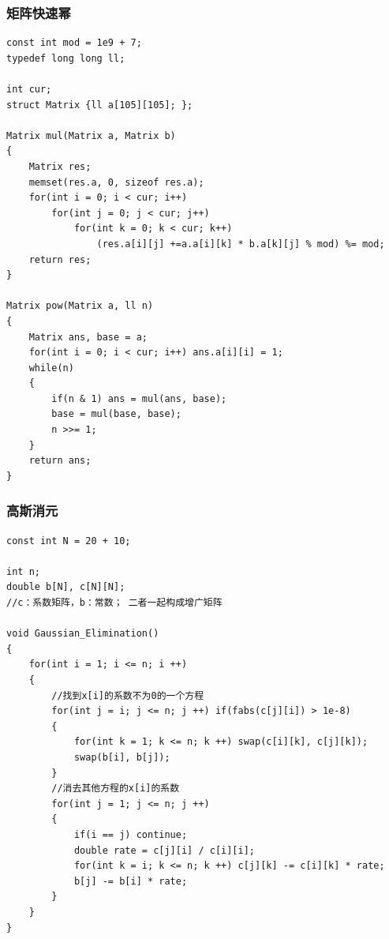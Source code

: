 \documentclass[twoside]{article}
\begin{document}
\subsubsection{矩阵快速幂}
\begin{lstlisting}
const int mod = 1e9 + 7;
typedef long long ll;

int cur;
struct Matrix {ll a[105][105]; };

Matrix mul(Matrix a, Matrix b)
{
    Matrix res;
    memset(res.a, 0, sizeof res.a);
    for(int i = 0; i < cur; i++)
        for(int j = 0; j < cur; j++)
            for(int k = 0; k < cur; k++)
                (res.a[i][j] +=a.a[i][k] * b.a[k][j] % mod) %= mod;
    return res;
}

Matrix pow(Matrix a, ll n)
{
    Matrix ans, base = a;
    for(int i = 0; i < cur; i++) ans.a[i][i] = 1;
    while(n)
    {
        if(n & 1) ans = mul(ans, base);
        base = mul(base, base);
        n >>= 1;
    }
    return ans;
}\end{lstlisting}
\subsubsection{高斯消元}
\begin{lstlisting}
const int N = 20 + 10;

int n;
double b[N], c[N][N];
//c：系数矩阵，b：常数； 二者一起构成增广矩阵

void Gaussian_Elimination()
{
	for(int i = 1; i <= n; i ++)
	{
		//找到x[i]的系数不为0的一个方程
		for(int j = i; j <= n; j ++) if(fabs(c[j][i]) > 1e-8)
		{
			for(int k = 1; k <= n; k ++) swap(c[i][k], c[j][k]);
			swap(b[i], b[j]);
		}
		//消去其他方程的x[i]的系数
		for(int j = 1; j <= n; j ++)
		{
			if(i == j) continue;
			double rate = c[j][i] / c[i][i];
			for(int k = i; k <= n; k ++) c[j][k] -= c[i][k] * rate;
			b[j] -= b[i] * rate;
		}
	}
}\end{lstlisting}
\end{document}
